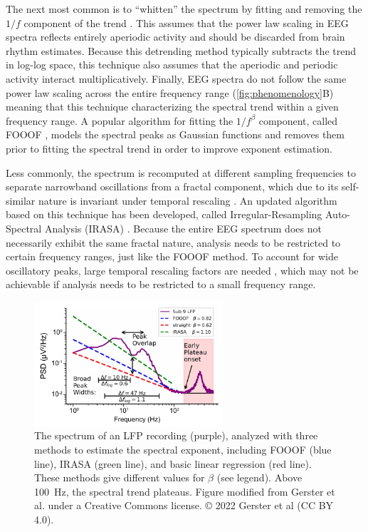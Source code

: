 The next most common is to ``whitten'' the spectrum by fitting and removing the $1/f$ component of the trend \cite{Buzsaki2004,Buzsaki2006,Donoghue2020}. This assumes that the power law scaling in EEG spectra reflects entirely aperiodic activity and should be discarded from brain rhythm estimates. Because this detrending method typically subtracts the trend in log-log space, this technique also assumes that the aperiodic and periodic activity interact multiplicatively. Finally, EEG spectra do not follow the same power law scaling across the entire frequency range (\autoref{fig:phenomenology}B) meaning that this technique characterizing the spectral trend within a given frequency range. A popular algorithm for fitting the $1/f^\beta$ component, called FOOOF \cite{Donoghue2020}, models the spectral peaks as Gaussian functions and removes them prior to fitting the spectral trend in order to improve exponent estimation.

Less commonly, the spectrum is recomputed at different sampling frequencies to separate narrowband oscillations from a fractal component, which due to its self-similar nature is invariant under temporal rescaling \cite{Yamamoto1993}. An updated algorithm based on this technique has been developed, called Irregular-Resampling Auto-Spectral Analysis (IRASA) \cite{Wen2016}. Because the entire EEG spectrum does not necessarily exhibit the same fractal nature, analysis needs to be restricted to certain frequency ranges, just like the FOOOF method. To account for wide oscillatory peaks, large temporal rescaling factors are needed \cite{Gerster2022}, which may not be achievable if analysis needs to be restricted to a small frequency range.

\begin{figure}
\vspace{-15pt}
\includegraphics[width=70mm]{Figures/chapter1/gerster.pdf}
\vspace{-10pt}
\caption{  The spectrum of an LFP recording (purple), analyzed with three methods to estimate the spectral exponent, including FOOOF (blue line), IRASA (green line), and basic linear regression (red line). These methods give different values for $\beta$ (see legend). Above \qty{100}{\hertz}, the spectral trend plateaus. Figure modified from Gerster et al. \cite{Gerster2022} under a Creative Commons license. © 2022 Gerster et al (CC BY 4.0).
} \label{fig:gerster}
\end{figure}

